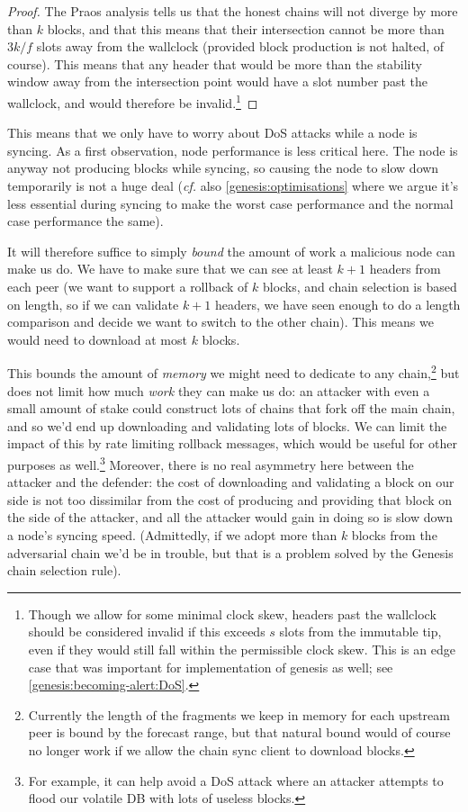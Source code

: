 \begin{proof}
The Praos analysis \cite{cryptoeprint:2017:573} tells us that the honest chains
will not diverge by more than $k$ blocks, and that this means that their
intersection cannot be more than $3k/f$ slots away from the wallclock (provided
block production is not halted, of course). This means that any header that
would be more than the stability window away from the intersection point
would have a slot number past the wallclock, and would therefore be
invalid.\footnote{Though we allow for some minimal clock skew, headers past
the wallclock should be considered invalid if this exceeds $s$ slots from the
immutable tip, even if they would still fall within the permissible clock
skew. This is an edge case that was important for implementation of genesis
as well; see \cref{genesis:becoming-alert:DoS}.}
\end{proof}

This means that we only have to worry about DoS attacks while a node is syncing.
As a first observation, node performance is less critical here. The node is
anyway not producing blocks while syncing, so causing the node to slow down
temporarily is not a huge deal (\emph{cf.} also \cref{genesis:optimisations}
where we argue it's less essential during syncing to make the worst case
performance and the normal case performance the same).

It will therefore suffice to simply \emph{bound} the amount of work a malicious
node can make us do. We have to make sure that we can see at least $k+1$ headers
from each peer (we want to support a rollback of $k$ blocks, and chain selection
is based on length, so if we can validate $k+1$ headers, we have seen enough to
do a length comparison and decide we want to switch to the other chain). This
means we would need to download at most $k$ blocks.

This bounds the amount of \emph{memory} we might need to dedicate to any
chain,\footnote{Currently the length of the fragments we keep in memory for each
upstream peer is bound by the forecast range, but that natural bound would of
course no longer work if we allow the chain sync client to download blocks.} but
does not limit how much \emph{work} they can make us do: an attacker with even a
small amount of stake could construct lots of chains that fork off the main
chain, and so we'd end up downloading and validating lots of blocks. We can
limit the impact of this by rate limiting rollback messages, which would be
useful for other purposes as well.\footnote{For example, it can help avoid a DoS
attack where an attacker attempts to flood our volatile DB with lots of useless
blocks.}  Moreover, there is no real asymmetry here between the attacker and the
defender: the cost of downloading and validating a block on our side is  not too
dissimilar from the cost of producing and providing that block on the side of
the attacker, and all the attacker would gain in doing so is slow down a node's
syncing speed. (Admittedly, if we adopt more than $k$ blocks from the
adversarial chain we'd be in trouble, but that is a problem solved by the
Genesis chain selection rule).

